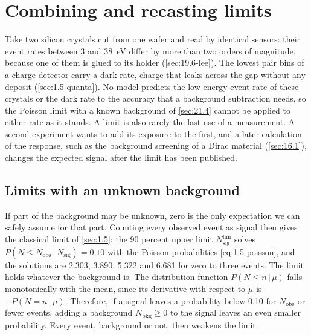 \section{Combining and recasting limits}\label{sec:21.5}

Take two silicon crystals cut from one wafer and read by identical sensors: their event rates between 3 and \SI{38}{eV} differ by more than two orders of magnitude, because one of them is glued to its holder (\cref{sec:19.6-lee}). The lowest pair bins of a charge detector carry a dark rate, charge that leaks across the gap without any deposit (\cref{sec:1.5-quanta}). No model predicts the low-energy event rate of these crystals or the dark rate to the accuracy that a background subtraction needs, so the Poisson limit with a known background of \cref{sec:21.4} cannot be applied to either rate as it stands. A limit is also rarely the last use of a measurement. A second experiment wants to add its exposure to the first, and a later calculation of the response, such as the background screening of a Dirac material (\cref{sec:16.1}), changes the expected signal after the limit has been published.

\subsection{Limits with an unknown background}\label{sec:21.5-unknown}

If part of the background may be unknown, zero is the only expectation we can safely assume for that part. Counting every observed event as signal then gives the classical limit of \cref{sec:1.5}: the 90 percent upper limit $N_{\mathrm{sig}}^{\mathrm{lim}}$ solves $P(N \le N_{\mathrm{obs}}\,|\,N_{\mathrm{sig}}) = 0.10$ with the Poisson probabilities \cref{eq:1.5-poisson}, and the solutions are 2.303, 3.890, 5.322 and 6.681 for zero to three events. The limit holds whatever the background is. The distribution function $P(N \le n\,|\,\mu)$ falls monotonically with the mean, since its derivative with respect to $\mu$ is $-P(N = n\,|\,\mu)$. Therefore, if a signal leaves a probability below 0.10 for $N_{\mathrm{obs}}$ or fewer events, adding a background $N_{\mathrm{bkg}} \ge 0$ to the signal leaves an even smaller probability. Every event, background or not, then weakens the limit.

